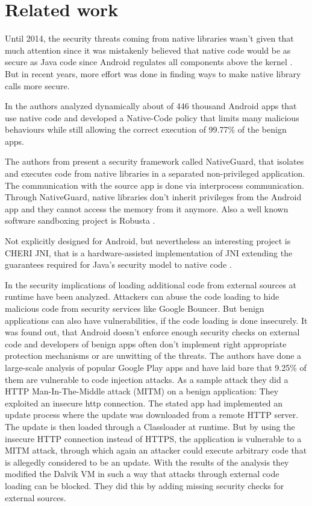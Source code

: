 \section{Related work}

Until 2014, the security threats coming from native libraries wasn't given that much attention since it was mistakenly believed that native code would be as secure as Java code since Android regulates all components above the kernel \cite[p. 1]{Sun:2014:NPA:2627393.2627396}. \\
But in recent years, more effort was done in finding ways to make native library calls more secure.

In \cite{Afonso2016GoingNU} the authors analyzed dynamically about of 446 thousand Android apps that use native code and developed a Native-Code policy that limits many malicious behaviours while still allowing the correct execution of 99.77\% of the benign apps.

The authors from \cite{Sun:2014:NPA:2627393.2627396} present a security framework called NativeGuard, that isolates and executes code from native libraries in a separated non-privileged application. The communication with the source app is done via interprocess communication. Through NativeGuard, native libraries don't inherit privileges from the Android app and they cannot access the memory from it anymore.  
Also a well known software sandboxing project is Robusta \cite{Siefers:2010:RTN:1866307.1866331}. %

Not explicitly designed for Android, but nevertheless an interesting project is CHERI JNI, that is a hardware-assisted implementation of JNI extending the guarantees required for Java's security model to native code \cite{Chisnall:2017:CJS:3093337.3037725}.

In \cite{ExecuteThis} the security implications of loading additional code from external sources at runtime have been analyzed. Attackers can abuse the code loading to hide malicious code from security services like Google Bouncer. But benign applications can also have vulnerabilities, if the code loading is done insecurely. It was found out, that Android doesn't enforce enough security checks on external code and developers of benign apps often don't implement right appropriate protection mechanisms or are unwitting of the threats. The authors have done a large-scale analysis of popular Google Play apps and have laid bare that 9.25\% of them are vulnerable to code injection attacks. As a sample attack they did a HTTP Man-In-The-Middle attack (MITM) on a benign application:
They exploited an insecure http connection. The stated app had implemented an update process where the update was downloaded from a remote HTTP server. The update is then loaded through a Classloader at runtime. But by using the insecure HTTP connection instead of HTTPS, the application is vulnerable to a MITM attack, through which again an attacker could execute arbitrary code that is allegedly considered to be an update.
With the results of the analysis they modified the Dalvik VM in such a way that attacks through external code loading can be blocked. They did this by adding missing security checks for external sources.

